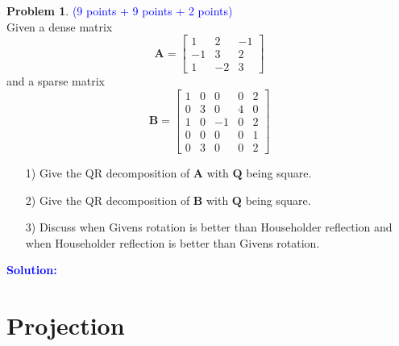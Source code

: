 \documentclass[english,onecolumn]{IEEEtran}
\begin{document}
\noindent\textbf{Problem 1}. \textcolor{blue}{(9 points + 9 points + 2 points)}\\
Given a dense matrix 
\begin{equation}
    \mathbf{A} = \begin{bmatrix}
    1&2&-1\\
    -1&3&2\\
    1&-2&3
    \end{bmatrix}
\end{equation}
and a sparse matrix 
\begin{equation}
    \mathbf{B} = \begin{bmatrix}
    1&0&0&0&2\\
    0&3&0&4&0\\
    1&0&-1&0&2\\
    0&0&0&0&1\\
    0&3&0&0&2
    \end{bmatrix}
\end{equation}
\begin{itemize}
    \item[1)] Give the QR decomposition of $\mathbf{A}$ with $\mathbf{Q}$ being square.
    \item[2)] Give the QR decomposition of $\mathbf{B}$ with $\mathbf{Q}$ being square.
    \item[3)] Discuss when Givens rotation is better than Householder reflection and when Householder reflection is better than Givens rotation.
\end{itemize}
\noindent\textcolor{blue}{
	\textbf{Solution:}
}


\newpage
\section{Projection}
\end{document}
